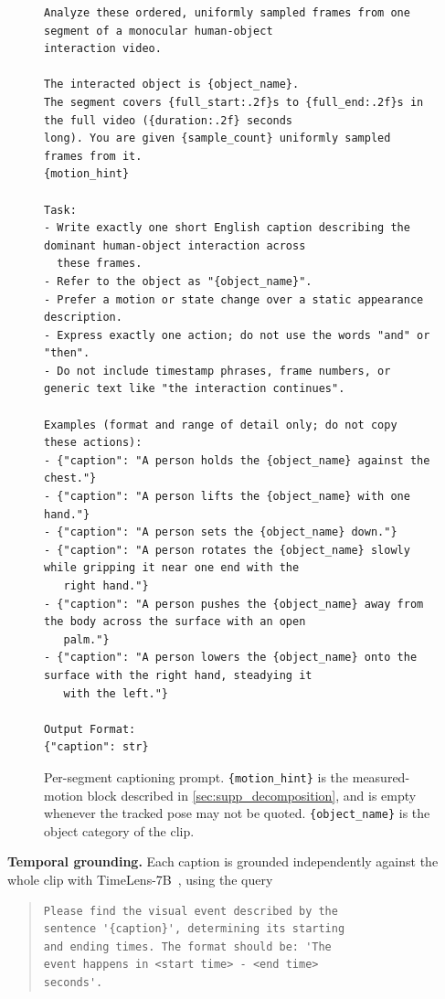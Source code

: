 \begin{figure}[t]
\centering
\small
\begin{verbatim}
Analyze these ordered, uniformly sampled frames from one segment of a monocular human-object
interaction video.

The interacted object is {object_name}.
The segment covers {full_start:.2f}s to {full_end:.2f}s in the full video ({duration:.2f} seconds
long). You are given {sample_count} uniformly sampled frames from it.
{motion_hint}

Task:
- Write exactly one short English caption describing the dominant human-object interaction across
  these frames.
- Refer to the object as "{object_name}".
- Prefer a motion or state change over a static appearance description.
- Express exactly one action; do not use the words "and" or "then".
- Do not include timestamp phrases, frame numbers, or generic text like "the interaction continues".

Examples (format and range of detail only; do not copy these actions):
- {"caption": "A person holds the {object_name} against the chest."}
- {"caption": "A person lifts the {object_name} with one hand."}
- {"caption": "A person sets the {object_name} down."}
- {"caption": "A person rotates the {object_name} slowly while gripping it near one end with the
   right hand."}
- {"caption": "A person pushes the {object_name} away from the body across the surface with an open
   palm."}
- {"caption": "A person lowers the {object_name} onto the surface with the right hand, steadying it
   with the left."}

Output Format:
{"caption": str}
\end{verbatim}
\caption{Per-segment captioning prompt.  \texttt{\{motion\_hint\}} is the
measured-motion block described in \cref{sec:supp_decomposition}, and is empty
whenever the tracked pose may not be quoted.  \texttt{\{object\_name\}} is the
object category of the clip.}
\label{fig:supp_prompt_segment}
\end{figure}

\noindent\textbf{Temporal grounding.}
Each caption is grounded independently against the whole clip with
TimeLens-7B~\cite{zeng2025timelens}, using the query

\begin{quote}\small\begin{verbatim}
Please find the visual event described by the
sentence '{caption}', determining its starting
and ending times. The format should be: 'The
event happens in <start time> - <end time>
seconds'.
\end{verbatim}
\end{quote}

